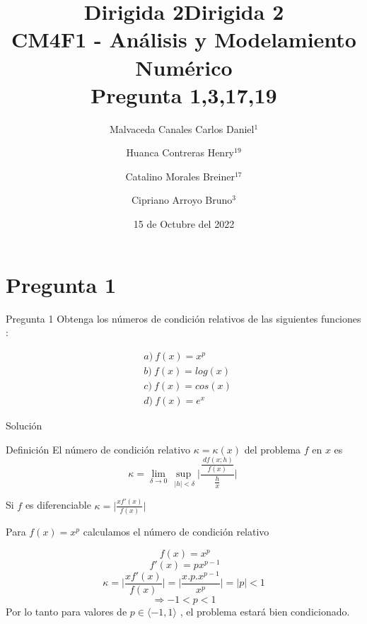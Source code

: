 \documentclass[10pts]{beamer}
\title{Dirigida 2}
\author[]{Malvaceda Canales Carlos Daniel$^1$ \and Huanca Contreras Henry$^{19}$ \and Catalino Morales Breiner$^{17}$ \and Cipriano Arroyo Bruno$^3$
}
\title{Dirigida 2\\CM4F1 - Análisis y Modelamiento Numérico \\Pregunta 1,3,17,19}
\date{15 de Octubre del 2022}
\begin{document}
\maketitle

\section{Pregunta 1}

\begin{frame}{Pregunta 1}
     Obtenga los números de condición relativos de las siguientes funciones :

        \begin{equation}
        \begin{split}
	    &a) \ f(x)=x^p \\
	    &b) \ f(x)=log(x) \\
	    &c) \ f(x)=cos(x) \\
	    &d) \ f(x)=e^x
	    \end{split}
        \end{equation}
        
\end{frame}

\begin{frame}{Solución}
    
        \begin{block}{Definición}
		El número de condición relativo $\kappa = \kappa(x)$ del problema $f$ en $x$ es 
		\[ \kappa = \lim_{\delta\to 0} \sup_{\ |h|<\delta} \Bigg | \frac{\frac{\ df(x;h)}{f(x)}}{\frac{h}{x}} \Bigg |\ \]
	\end{block}
	
	Si $f$ es diferenciable $\kappa = \bigg | \frac{x f'(x)}{f(x)} \bigg|$
	
	
    
\end{frame}

\vspace*{\fill}
Para $f(x) = x^p$ calculamos el número de condición relativo 

    \[ \ f(x)=x^p\]
    \[ \ f'(x)= px^{p-1} \]
    \[\kappa = \bigg | \frac{x f'(x)}{f(x)} \bigg|  = \bigg | \frac{x.p .x^{p-1}}{x^p} \bigg| = |p| < 1\]
    \[\Rightarrow -1<p<1	 \]
    Por lo tanto para valores de  $p \in \langle -1,1\rangle$ , el problema estará bien condicionado.

\vspace*{\fill}

\newpage

\vspace*{\fill}
\end{document}
